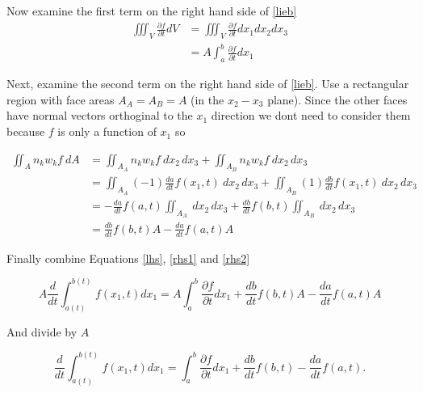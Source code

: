 \documentclass[11pt,twoside]{article}
\newcommand{\p}[2]{\frac{\partial#1}{\partial#2}}
\begin{document}
\begin{enumerate}
Now examine the first term on the right hand side of \autoref{lieb}
\begin{align}
\iiint_V \p{f}{t} dV &= \iiint_V \p{f}{t} dx_1dx_2dx_3\nonumber\\
&=A\int_a^b \p{f}{t} dx_1\label{rhs1}
\end{align}

Next, examine the second term on the right hand side of \autoref{lieb}. Use a rectangular region with face areas $A_A=A_B=A$ (in the $x_2-x_3$ plane). Since the other faces have normal vectors orthoginal to the $x_1$ direction we dont need to consider them because $f$ is only a function of $x_1$ so 

\begin{align}
\iint_A n_k w_k f\: dA &= \iint_{A_A} n_k w_k f\: dx_2\,dx_3 + \iint_{A_B} n_k w_k f\: dx_2\,dx_3 \nonumber\\
                       &= \iint_{A_A} (-1) \frac{da}{dt} f (x_1,t)\: dx_2\,dx_3 + \iint_{A_B} (1) \frac{db}{dt} f (x_1,t)\: dx_2\,dx_3 \nonumber\\
                       &=  - \frac{da}{dt} f (a,t)\iint_{A_A}\: dx_2\,dx_3 + \frac{db}{dt} f (b,t)\iint_{A_B}\: dx_2\,dx_3 \nonumber\\
                       & = \frac{db}{dt} f (b,t) A - \frac{da}{dt} f (a,t)A\label{rhs2}
\end{align}

Finally combine Equations \ref{lhs}, \ref{rhs1} and \ref{rhs2}

$$A\frac{d}{dt}\int_{a(t)}^{b(t)}f(x_1,t)dx_1 = A\int_a^b \p{f}{t} dx_1 + \frac{db}{dt} f (b,t) A - \frac{da}{dt} f (a,t)A$$

And divide by $A$

$$\frac{d}{dt}\int_{a(t)}^{b(t)}f(x_1,t)dx_1 = \int_a^b \p{f}{t} dx_1 + \frac{db}{dt} f (b,t)  - \frac{da}{dt} f (a,t).$$


%
%

\end{enumerate}
\end{document}
